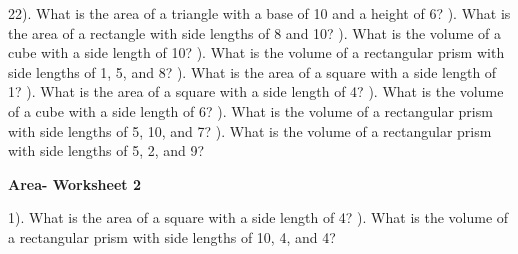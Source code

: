 \documentclass{article}%
\begin{document}
22). What is the area of a triangle with a base of 10 and a height of 6?%
\newline%
\newline%
). What is the area of a rectangle with side lengths of 8 and 10?%
\newline%
\newline%
). What is the volume of a cube with a side length of 10?%
\newline%
\newline%
). What is the volume of a rectangular prism with side lengths of 1, 5, and 8?%
\newline%
\newline%
). What is the area of a square with a side length of 1?%
\newline%
\newline%
). What is the area of a square with a side length of 4?%
\newline%
\newline%
). What is the volume of a cube with a side length of 6?%
\newline%
\newline%
). What is the volume of a rectangular prism with side lengths of 5, 10, and 7?%
\newline%
\newline%
). What is the volume of a rectangular prism with side lengths of 5, 2, and 9?%
\newline%
\newline%
\newline%
\pagebreak%
\large%
\begin{center}%
\textbf{Area- Worksheet 2}%
\newline%
\end{center} \normalsize%
1). What is the area of a square with a side length of 4?%
\newline%
\newline%
). What is the volume of a rectangular prism with side lengths of 10, 4, and 4?%
\newline%
\newline%
\newline%
\end{document}
